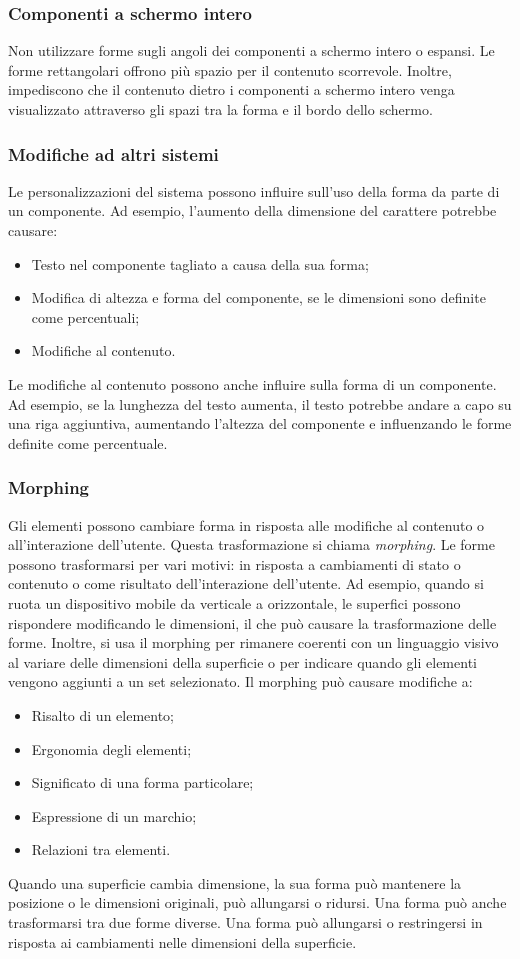 \documentclass[12pt, a4paper]{report}
\begin{document}
	\subsubsection{Componenti a schermo intero}
	Non utilizzare forme sugli angoli dei componenti a schermo intero o espansi. Le forme rettangolari offrono più spazio per il contenuto scorrevole. Inoltre, impediscono che il contenuto dietro i componenti a schermo intero venga visualizzato attraverso gli spazi tra la forma e il bordo dello schermo.

	\subsubsection{Modifiche ad altri sistemi}
	Le personalizzazioni del sistema possono influire sull'uso della forma da parte di un componente. Ad esempio, l'aumento della dimensione del carattere potrebbe causare:
	\begin{itemize}
		\item Testo nel componente tagliato a causa della sua forma;
		\item Modifica di altezza e forma del componente, se le dimensioni sono definite come percentuali;
		\item Modifiche al contenuto.
	\end{itemize}
	Le modifiche al contenuto possono anche influire sulla forma di un componente. Ad esempio, se la lunghezza del testo aumenta, il testo potrebbe andare a capo su una riga aggiuntiva, aumentando l'altezza del componente e influenzando le forme definite come percentuale.

	\subsubsection{Morphing}
	Gli elementi possono cambiare forma in risposta alle modifiche al contenuto o all'interazione dell'utente. Questa trasformazione si chiama \textit{morphing}. Le forme possono trasformarsi per vari motivi: in risposta a cambiamenti di stato o contenuto o come risultato dell'interazione dell'utente. Ad esempio, quando si ruota un
	dispositivo mobile da verticale a orizzontale, le superfici possono rispondere modificando le dimensioni, il che può causare la trasformazione delle forme.  Inoltre, si usa il morphing per rimanere coerenti con un linguaggio visivo al variare delle dimensioni della superficie o
	per indicare quando gli elementi vengono aggiunti a un set selezionato. Il morphing può causare modifiche a:
	\begin{itemize}
		\item Risalto di un elemento;
		\item Ergonomia degli elementi;
		\item Significato di una forma particolare;
		\item Espressione di un marchio;
		\item Relazioni tra elementi.
	\end{itemize}
	Quando una superficie cambia dimensione, la sua forma può mantenere la posizione o le dimensioni originali, può allungarsi o ridursi. Una forma può anche trasformarsi tra due forme diverse.
	Una forma può allungarsi o restringersi in risposta ai cambiamenti nelle dimensioni della superficie.
\end{document}
